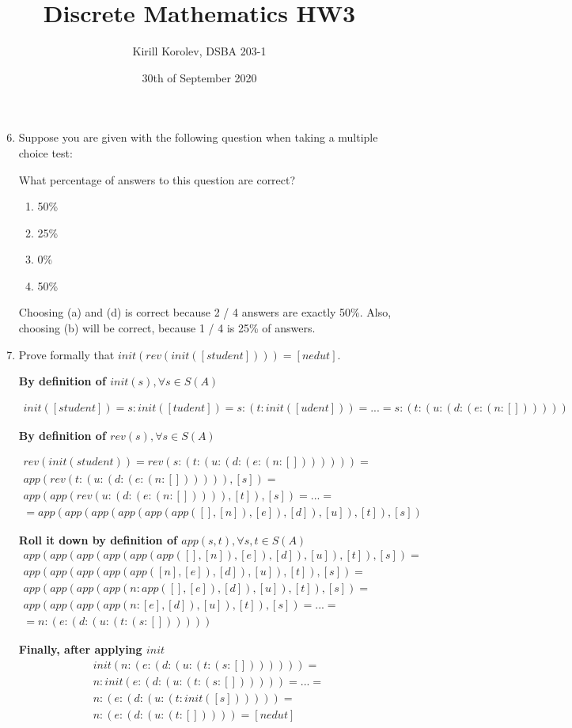 \documentclass{article}
\title{Discrete Mathematics HW3}
\author{Kirill Korolev, DSBA 203-1}
\date{30th of September 2020}
\begin{document}
\maketitle

\begin{enumerate}
\setcounter{enumi}{5}

\item Suppose you are given with the following question when taking a multiple choice test:

What percentage of answers to this question are correct?

\begin{enumerate}
\item 50\%
\item 25\%
\item 0\%
\item 50\%
\end{enumerate}

Choosing (a) and (d) is correct because 2 / 4 answers are exactly 50\%. Also, choosing (b) will be correct, because 1 / 4 is 25\% of answers.

\item Prove formally that $init(rev(init([student]))) = [nedut]$.

\textbf{By definition of $init(s), \forall s \in S(A)$}

\begin{align*}
init([student]) = s : init([tudent]) = s : (t : init([udent])) = ... = s : (t : (u : (d : (e : (n : [])))))
\end{align*}

\textbf{By definition of $rev(s), \forall s \in S(A)$}

\begin{align*}
rev(init(student)) = rev(s : (t : (u : (d : (e : (n : [])))))) =\\
app(rev(t : (u : (d : (e : (n : []))))), [s]) =\\ app(app(rev(u : (d : (e : (n : [])))), [t]), [s]) = ... = \\ = app(app(app(app(app(app([], [n]), [e]), [d]), [u]), [t]), [s]) 
\end{align*}

\textbf{Roll it down by definition of $app(s, t), \forall s, t \in S(A)$}
\begin{align*}
app(app(app(app(app(app([], [n]), [e]), [d]), [u]), [t]), [s]) =\\
app(app(app(app(app([n], [e]), [d]), [u]), [t]), [s]) = \\
app(app(app(app(n: app([], [e]), [d]), [u]), [t]), [s]) = \\
app(app(app(app(n: [e], [d]), [u]), [t]), [s]) = ... = \\
= n : (e : (d : (u : (t : (s : [])))))
\end{align*}

\textbf{Finally, after applying $init$}
\begin{align*}
init(n : (e : (d : (u : (t : (s : [])))))) =\\ n : init(e : (d : (u : (t : (s : []))))) = ... =\\ n : (e : (d : (u : (t : init([s]))))) =\\ n : (e : (d : (u : (t : [])))) = [nedut]
\end{align*}

\end{enumerate}
\end{document}
